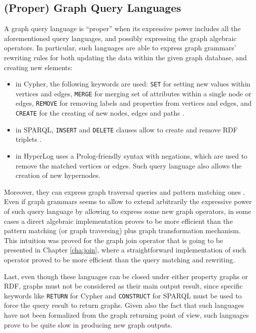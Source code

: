 
\subsection{(Proper) Graph Query Languages}\label{subsec:proper}
A graph query language is ``proper'' when its expressive power includes all the aforementioned query languages, and possibly expressing the graph algebraic operators. In particular, such languages are able to express graph grammars' rewriting rules for both updating the data within the given graph database, and creating new elements:
\begin{itemize}
	\item in Cypher, the following keywords are used: \texttt{SET} for setting new values within vertices and edges, \texttt{MERGE} for merging set of attributes within a single node or edges, \texttt{REMOVE} for removing labels and properties from vertices and edges, and \texttt{CREATE} for the creating of new nodes, edges and paths \cite{CypherCheat}.
	\item in SPARQL, \texttt{INSERT} and \texttt{DELETE} clauses allow to create and remove RDF triplets \cite{sparql11update2013}.
	\item in HyperLog \cite{poulovassilis2001} uses a Prolog-friendly syntax with negations, which are used to remove the matched vertices or edges. Such query language also allows the creation of new hypernodes.
\end{itemize} 
Moreover, they can express graph traversal queries \cite{Kostylev2015} and pattern matching ones \cite{JunghannsKAPR17}. Even if graph grammars seems to allow to extend arbitrarily the expressive power of such query language by allowing to express some new graph operators, in some cases a direct algebraic implementation proves to be more efficient than the pattern matching (or graph traversing) plus graph transformation mechanism. This intuition was proved for the graph join operator that is going to be presented in Chapter \vref{cha:join}, where a straightforward implementation of such operator proved to be more efficient than the query matching and rewriting.


Last, even though these languages can be closed under either property graphs or RDF, graphs must not be considered as their main output result, since specific keywords like  \texttt{RETURN} for Cypher and \texttt{CONSTRUCT} for SPARQL must be used to force the query result to return graphs. Given also the fact that such languages have not been formalized from the graph returning point of view, such languages prove to be quite slow in producing new graph outputs. 

